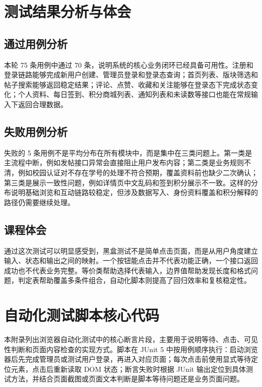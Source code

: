 \documentclass[bwprint]{report}
\begin{document}
\section{测试结果分析与体会}
\subsection{通过用例分析}
本轮 75 条用例中通过 70 条，说明系统的核心业务闭环已经具备可用性。注册和登录链路能够完成新用户创建、管理员登录和登录态查询；首页列表、版块筛选和帖子搜索能够返回稳定结果；评论、点赞、收藏和关注能够在登录态下完成状态变化；个人资料、每日签到、积分商城列表、通知列表和未读数等接口也能在常规输入下返回合理数据。

\subsection{失败用例分析}
失败的 5 条用例不是平均分布在所有模块中，而是集中在三类问题上。第一类是主流程中断，例如发帖接口异常会直接阻止用户发布内容；第二类是业务规则不清，例如校园认证对不存在学号的处理不符合预期，覆盖资料前也缺少二次确认；第三类是展示一致性问题，例如详情页中文乱码和签到积分展示不一致。这样的分布说明基础浏览和互动链路较稳定，但涉及数据写入、身份资料覆盖和积分解释的路径仍需要继续处理。

\subsection{课程体会}
通过这次测试可以明显感受到，黑盒测试不是简单点击页面，而是从用户角度建立输入、状态和输出之间的映射。一个按钮能点击并不代表功能正确，一个接口返回成功也不代表业务完整。等价类帮助选择代表输入，边界值帮助发现长度和格式问题，判定表帮助覆盖多条件组合，自动化脚本则提高了回归效率和复核稳定性。


\appendix
\section{自动化测试脚本核心代码}
本附录列出浏览器自动化测试中的核心断言片段，主要用于说明等待、点击、可见性判断和页面内容检查的实现方式。脚本在 JUnit 5 中按用例顺序执行：启动浏览器后先完成管理员或测试用户登录，再进入对应页面；每次点击前使用显式等待定位元素，点击后重新读取 DOM 状态；断言失败时根据 JUnit 输出定位到具体测试方法，并结合页面截图或页面文本判断是脚本等待问题还是业务页面问题。
\end{document}
